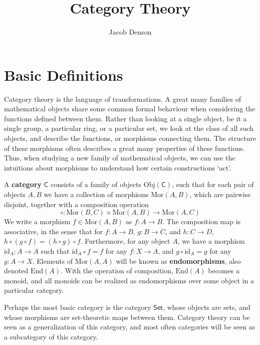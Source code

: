 

\title{Category Theory}
\author{Jacob Denson}



\maketitle
\tableofcontents

\chapter{Basic Definitions}


Category theory is the language of transformations. A great many families of mathematical objects share some common formal behaviour when considering the functions defined between them. Rather than looking at a single object, be it a single group, a particular ring, or a particular set, we look at the class of all such objects, and describe the functions, or morphisms connecting them. The structure of these morphisms often describes a great many properties of these functions. Thus, when studying a new family of mathematical objects, we can use the intuitions about morphisms to understand how certain constructions `act'.

A {\bf category} $\mathsf{C}$ consists of a family of objects $\text{Obj}(\mathsf{C})$, such that for each pair of objects $A,B$ we have a collection of morphisms $\text{Mor}(A,B)$, which are pairwise disjoint, together with a composition operation
%
\[ \circ: \text{Mor}(B,C) \times \text{Mor}(A,B) \to \text{Mor}(A,C) \]
%
We write a morphism $f \in \text{Mor}(A,B)$ as $f: A \to B$. The composition map is associative, in the sense that for $f: A \to B$, $g: B \to C$, and $h: C \to D$, $h \circ (g \circ f) = (h \circ g) \circ f$. Furthermore, for any object $A$, we have a morphism $\text{id}_A: A \to A$ such that $\text{id}_A \circ f = f$ for any $f: X \to A$, and $g \circ \text{id}_A = g$ for any $g: A \to X$. Elements of $\text{Mor}(A,A)$ will be known as {\bf endomorphisms}, also denoted $\text{End}(A)$. With the operation of composition, $\text{End}(A)$ becomes a monoid, and all monoids can be realized as endomorphisms over some object in a particular category.

\begin{example}
    Perhaps the most basic category is the category $\mathsf{Set}$, whose objects are sets, and whose morphisms are set-theoretic maps between them. Category theory can be seen as a generalization of this category, and most often categories will be seen as a subcategory of this category.
\end{example}

